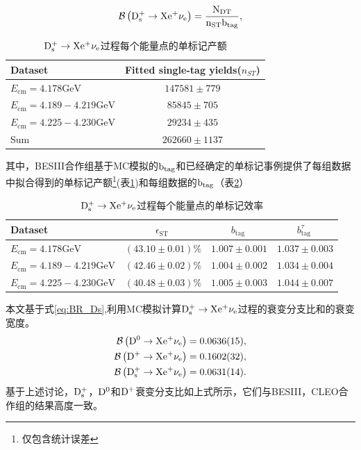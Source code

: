 \begin{equation}
    \mathrm{\mathcal{B}\left(D_s^{+} \rightarrow X e^{+} \nu_e\right)=\frac{N_{\mathrm{DT}}}{n_{\mathrm{ST}} b_{\mathrm{tag}}}},
    \label{eq:BR_Ds}
    \end{equation}
    \begin{table}[h!]
        \scriptsize
        \centering
        \begin{tabular}{lc}
            \hline \hline Dataset & Fitted single-tag yields($n_{ST}$) \\
            \hline$E_{\mathrm{cm}}=4.178 \mathrm{GeV}$ & $147581 \pm 779$ \\
            $E_{\mathrm{cm}}=4.189-4.219 \mathrm{GeV}$ & $85845 \pm 705$ \\
            $E_{\mathrm{cm}}=4.225-4.230 \mathrm{GeV}$ & $29234 \pm 435$ \\
            Sum & $262660 \pm 1137$ \\
            \hline \hline
            \end{tabular}
        \caption{$\mathrm{D_s^+\to X e^+\nu_e}$过程每个能量点的单标记产额}
        \label{tab:BESIII_Ds_singleyeilds_fit}
    \end{table}
其中，BESIII合作组基于MC模拟的$\mathrm{b_{tag}}$和已经确定的单标记事例提供了每组数据中拟合得到的单标记产额\footnote{仅包含统计误差}(表\ref{tab:BESIII_Ds_singleyeilds_fit})和每组数据的$\mathrm{\text{b}_{tag}}$（表\ref{tab:BESIII_Ds_btag}）
\begin{table}[htbp]
    \scriptsize
    \centering
    \begin{tabular}{lccc}
        \hline \hline Dataset & $\epsilon_{\text {ST }}$ & $b_{\text {tag }}$ & $b_{\text {tag }}^\tau$ \\
        \hline$E_{\mathrm{cm}}=4.178 \mathrm{GeV}$ & $(43.10 \pm 0.01) \%$ & $1.007 \pm 0.001$ & $1.037 \pm 0.003$ \\
        $E_{\mathrm{cm}}=4.189-4.219 \mathrm{GeV}$ & $(42.46 \pm 0.02) \%$ & $1.004 \pm 0.002$ & $1.034 \pm 0.004$ \\
        $E_{\mathrm{cm}}=4.225-4.230 \mathrm{GeV}$ & $(40.48 \pm 0.03) \%$ & $1.005 \pm 0.003$ & $1.044 \pm 0.007$ \\
        \hline \hline
        \end{tabular}
        \caption{$\mathrm{D_s^+\to X e^+\nu_e}$过程每个能量点的单标记效率}
    \label{tab:BESIII_Ds_btag}
\end{table}
本文基于式\eqref{eq:BR_Ds},利用MC模拟计算$\mathrm{D_s^{+} \rightarrow X e^{+} \nu_e}$过程的衰变分支比和的衰变宽度。
\begin{equation}
    \begin{aligned}
        \mathcal{B}\left(\mathrm{D^0 \rightarrow X e^{+} \nu_e}\right)&=0.0636(15) ,\\
        \mathcal{B}\left(\mathrm{D^{+} \rightarrow X e^{+} \nu_e}\right)&=0.1602(32),\\
        \mathcal{B}\left(\mathrm{D_s^{+} \rightarrow X e^{+} \nu_e}\right)&=0.0631(14).\\
    \end{aligned}
    \label{eq:br_fit}
\end{equation}
基于上述讨论，$\mathrm{D_s^+}$，$\mathrm{D^0}$和$\mathrm{D^+}$衰变分支比如上式所示，它们与BESIII，CLEO合作组的结果高度一致。
    
